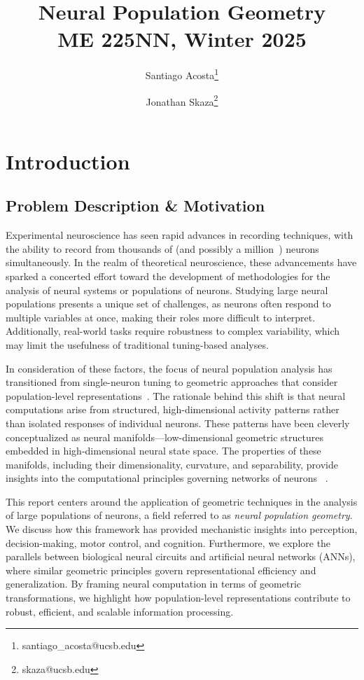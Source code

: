 \documentclass[11pt,a4paper]{article}
\author[1]{Santiago Acosta\thanks{santiago\_acosta@ucsb.edu}}
\author[1]{Jonathan Skaza\thanks{skaza@ucsb.edu}}
\affil[1]{Dynamical Neuroscience Graduate Program, University of California, Santa Barbara}
\title {Neural Population Geometry \\[1ex] \large ME 225NN, Winter 2025}
\date{}
\begin{document}
\maketitle
\section{Introduction}

\subsection{Problem Description \& Motivation}
Experimental neuroscience has seen rapid advances in recording techniques, with the ability to record from thousands of (and possibly a million~\cite{demas2021high}) neurons simultaneously. In the realm of theoretical neuroscience, these advancements have sparked a concerted effort toward the development of methodologies for the analysis of neural systems or populations of neurons. Studying large neural populations presents a unique set of challenges, as neurons often respond to multiple variables at once, making their roles more difficult to interpret. Additionally, real-world tasks require robustness to complex variability, which may limit the usefulness of traditional tuning-based analyses.

In consideration of these factors, the focus of neural population analysis has transitioned from single-neuron tuning to geometric approaches that consider population-level representations~\cite{yuste2015neuron, saxena2019towards}. The rationale behind this shift is that neural computations arise from structured, high-dimensional activity patterns rather than isolated responses of individual neurons. These patterns have been cleverly conceptualized as neural manifolds---low-dimensional geometric structures embedded in high-dimensional neural state space. The properties of these manifolds, including their dimensionality, curvature, and separability, provide insights into the computational principles governing networks of neurons ~\cite{chung2021neural}.

This report centers around the application of geometric techniques in the analysis of large populations of neurons, a field referred to as \textit{neural population geometry}. We discuss how this framework has provided mechanistic insights into perception, decision-making, motor control, and cognition. Furthermore, we explore the parallels between biological neural circuits and artificial neural networks (ANNs), where similar geometric principles govern representational efficiency and generalization. By framing neural computation in terms of geometric transformations, we highlight how population-level representations contribute to robust, efficient, and scalable information processing.
\end{document}
